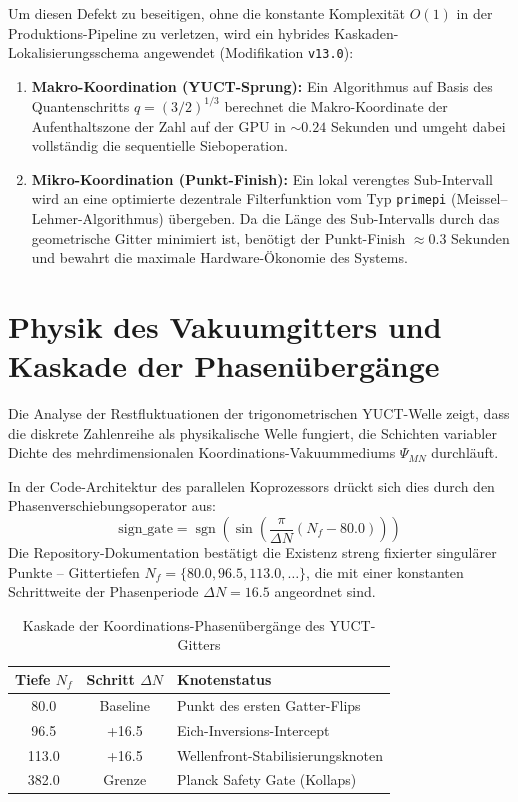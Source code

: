 \documentclass[11pt,a4paper]{article}
\begin{document}
	Um diesen Defekt zu beseitigen, ohne die konstante Komplexität $O(1)$ in der Produktions-Pipeline zu verletzen, wird ein hybrides Kaskaden-Lokalisierungsschema angewendet (Modifikation \texttt{v13.0}):
	\begin{enumerate}
		\item \textbf{Makro-Koordination (YUCT-Sprung):} Ein Algorithmus auf Basis des Quantenschritts $q = (3/2)^{1/3}$ berechnet die Makro-Koordinate der Aufenthaltszone der Zahl auf der GPU in $\sim 0.24$ Sekunden und umgeht dabei vollständig die sequentielle Sieboperation.
		\item \textbf{Mikro-Koordination (Punkt-Finish):} Ein lokal verengtes Sub-Intervall wird an eine optimierte dezentrale Filterfunktion vom Typ \texttt{primepi} (Meissel–Lehmer-Algorithmus) übergeben. Da die Länge des Sub-Intervalls durch das geometrische Gitter minimiert ist, benötigt der Punkt-Finish $\approx 0.3$ Sekunden und bewahrt die maximale Hardware-Ökonomie des Systems.
	\end{enumerate}
	
	\section{Physik des Vakuumgitters und Kaskade der Phasenübergänge}
	Die Analyse der Restfluktuationen der trigonometrischen YUCT-Welle zeigt, dass die diskrete Zahlenreihe als physikalische Welle fungiert, die Schichten variabler Dichte des mehrdimensionalen Koordinations-Vakuummediums $\Psi_{MN}$ durchläuft.
	
	In der Code-Architektur des parallelen Koprozessors drückt sich dies durch den Phasenverschiebungsoperator aus:
	\begin{equation}
		\mathrm{sign\_gate} = \operatorname{sgn}\!\left(\sin\!\left(\frac{\pi}{\Delta N} (N_f - 80.0)\right)\right)
	\end{equation}
	Die Repository-Dokumentation bestätigt die Existenz streng fixierter singulärer Punkte – Gittertiefen $N_f = \{80.0, 96.5, 113.0, \dots\}$, die mit einer konstanten Schrittweite der Phasenperiode $\Delta N = 16.5$ angeordnet sind.
	
	\begin{table}[h!]
		\centering
		\caption{Kaskade der Koordinations-Phasenübergänge des YUCT-Gitters}
		\label{tab:phase_transitions}
		\small
		\begin{tabular}{ccl}
			\toprule
			\textbf{Tiefe $N_f$} & \textbf{Schritt $\Delta N$} & \textbf{Knotenstatus} \\
			\midrule
			80.0  & Baseline & Punkt des ersten Gatter-Flips \\
			96.5  & +16.5 & Eich-Inversions-Intercept \\
			113.0 & +16.5 & Wellenfront-Stabilisierungsknoten \\
			382.0 & Grenze  & Planck Safety Gate (Kollaps) \\
			\bottomrule
		\end{tabular}
	\end{table}
	
\end{document}
